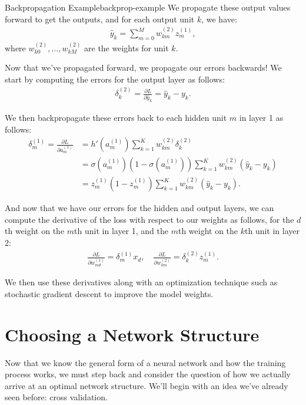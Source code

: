\begin{example}{Backpropagation Example}{backprop-example}
	We propagate these output values  forward to get the outputs, and for each output unit $k$, we have:
	\begin{align*}
		\hat{y}_{k} = \sum_{m=0}^{M} w_{km}^{(2)} z^{(1)}_{m},
	\end{align*}
where $w^{(2)}_{k0},\ldots,w^{(2)}_{kM}$ are the weights for unit $k$.
        
	Now that we've propagated forward, we propagate our errors backwards! We start by computing the errors for the output layer as follows:
	\begin{align*}
		\delta^{(2)}_{k} =  \frac{\partial L}{\partial \hat{y}_k}=\hat{y}_{k} - y_{k}.
	\end{align*}

	We then backpropagate these errors back to each hidden unit $m$ in layer 1 as follows:
	\begin{align*}
          \delta^{(1)}_{m} = \frac{\partial L}{\partial a_m^{(1)}} & =
                                                                     h'(a_m^{(1)})\sum_{k=1}^Kw^{(2)}_{km}\delta^{(2)}_k\\
                                                                   &=\sigma(a^{(1)}_m)(1-\sigma(a^{(1)}_m))\sum_{k=1}^Kw^{(2)}_{km}(\hat{y}_k-y_k)\\
                                                                   &=z_m^{(1)}(1-z_m^{(1)}) \sum_{k=1}^Kw^{(2)}_{km}(\hat{y}_k-y_k).
                                                                     \end{align*}

	And now that we have our errors for the hidden and output layers, we can compute the derivative of the loss with respect to our weights as follows, for the $d$th weight on the $m$th unit in layer 1, and the $m$th weight on the $k$th unit in layer 2: 
	\begin{align*}
		\frac{\partial L}{\partial w_{md}^{(1)}} = \delta^{(1)}_{m} x_{d}, \quad \frac{\partial L}{\partial w^{(2)}_{km}} = \delta^{(2)}_{k} z^{(1)}_{m}.
	\end{align*}
        
	We then use these derivatives along with an optimization technique such as stochastic gradient descent to improve the model weights.
\end{example}

\section{Choosing a Network Structure}
Now that we know the general form of a neural network and how the training process works, we must step back and consider the question of how we actually arrive at an optimal network structure. We'll begin with an idea we've already seen before: cross validation.

